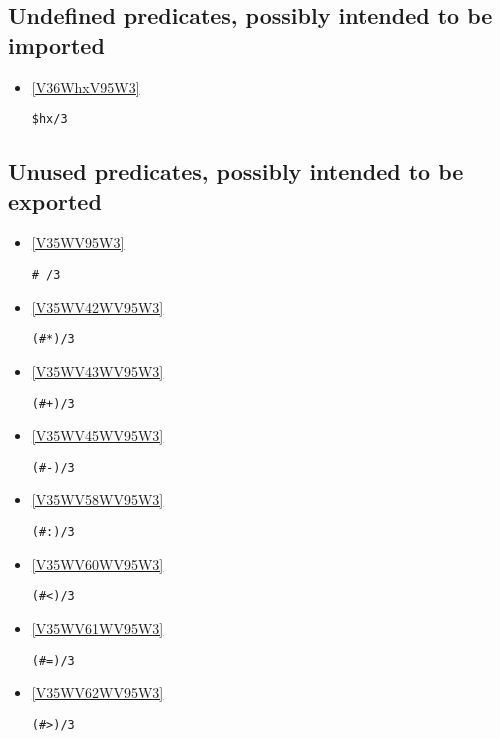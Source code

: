 \subsection{Undefined predicates, possibly intended to be imported} \label{undef}
\begin{itemize}
\item \ref{V36WhxV95W3} 
\begin{verbatim}
$hx/3
\end{verbatim}

\end{itemize}
\subsection{Unused predicates, possibly intended to be exported} \label{unused}
\begin{itemize}
\item \ref{V35WV95W3} 
\begin{verbatim}
# /3
\end{verbatim}

\item \ref{V35WV42WV95W3} 
\begin{verbatim}
(#*)/3
\end{verbatim}

\item \ref{V35WV43WV95W3} 
\begin{verbatim}
(#+)/3
\end{verbatim}

\item \ref{V35WV45WV95W3} 
\begin{verbatim}
(#-)/3
\end{verbatim}

\item \ref{V35WV58WV95W3} 
\begin{verbatim}
(#:)/3
\end{verbatim}

\item \ref{V35WV60WV95W3} 
\begin{verbatim}
(#<)/3
\end{verbatim}

\item \ref{V35WV61WV95W3} 
\begin{verbatim}
(#=)/3
\end{verbatim}

\item \ref{V35WV62WV95W3} 
\begin{verbatim}
(#>)/3
\end{verbatim}


\end{itemize}
